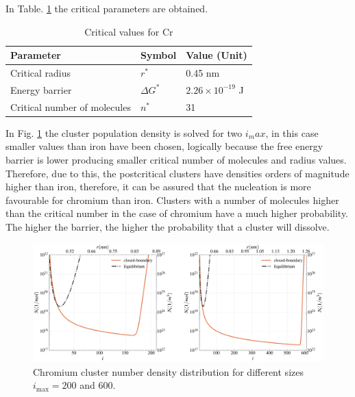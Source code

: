 In Table. \ref{tab:critical_cr} the critical parameters are obtained.
\begin{table}[h]
	\centering
	\begin{tabular}{|l|l|l|}
	\hline
	\textbf{Parameter} & \textbf{Symbol} & \textbf{Value (Unit)} \\ \hline
	Critical radius        & $r^*$             & 0.45 nm                 \\ \hline
	Energy barrier         & $\Delta G^*$             & $2.26 \times 10^{-19}$ J         \\ \hline
	Critical number of molecules       & $n^*$          & 31         \\ \hline
	\end{tabular}
	\caption{Critical values for Cr}
	\label{tab:critical_cr}
\end{table}

In Fig. \ref{fig:psd_cr} the cluster population density is solved for two $i_max$, in this case smaller values than iron have been chosen, logically because the free energy barrier is lower producing smaller critical number of molecules and radius values.
Therefore, due to this, the postcritical clusters have densities orders of magnitude higher than iron, therefore, it can be assured that the nucleation is more favourable for chromium than iron. Clusters with a number of molecules higher than the critical number in the case of chromium have a much higher probability.
The higher the barrier, the higher the probability that a cluster will dissolve.

\begin{figure}[H]
    \centering
    \includegraphics[width=1.1\linewidth]{psd_cr.png}
    \caption{Chromium cluster number density distribution for different sizes $i_{\text{max}} = 200$ and $600$.}
    \label{fig:psd_cr}
\end{figure}

